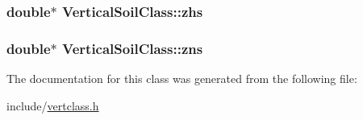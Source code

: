 \subsubsection[{\texorpdfstring{zhs}{zhs}}]{\setlength{\rightskip}{0pt plus 5cm}double$\ast$ Vertical\+Soil\+Class\+::zhs}\hypertarget{class_vertical_soil_class_ab2e0b360161cc8902b1f3dfe81d5d85a}{}\label{class_vertical_soil_class_ab2e0b360161cc8902b1f3dfe81d5d85a}
\subsubsection[{\texorpdfstring{zns}{zns}}]{\setlength{\rightskip}{0pt plus 5cm}double$\ast$ Vertical\+Soil\+Class\+::zns}\hypertarget{class_vertical_soil_class_aef780d5be37fc8494e93138deb47d07b}{}\label{class_vertical_soil_class_aef780d5be37fc8494e93138deb47d07b}


The documentation for this class was generated from the following file\+:\begin{DoxyCompactItemize}
\item 
include/\hyperlink{vertclass_8h}{vertclass.\+h}\end{DoxyCompactItemize}
